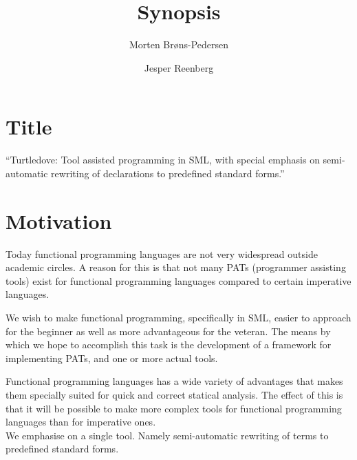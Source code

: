 \documentclass[a4paper,oneside]{article}
\author{Morten Brøns-Pedersen \and Jesper Reenberg}
\title{Synopsis}
\begin{document}
\maketitle


\section{Title}
``Turtledove: Tool assisted programming in SML, with special emphasis on semi-automatic rewriting of
declarations to predefined standard forms.''

\section{Motivation}
Today functional programming languages are not very widespread outside academic circles. A reason
for this is that not many PATs (programmer assisting tools) exist for functional programming languages
compared to certain imperative languages.

We wish to make functional programming, specifically in SML, easier to approach for the beginner as
well as more advantageous for the veteran. The means by which we hope to accomplish this task is the
development of a framework for implementing PATs, and one or more actual
tools.

Functional programming languages has a wide variety of advantages that makes them specially suited
for quick and correct statical analysis. The effect of this is that it will be possible to make more
complex tools for functional programming languages than for imperative ones.
\\

We emphasise on a single tool. Namely semi-automatic rewriting of terms to predefined standard
forms. 
\end{document}
